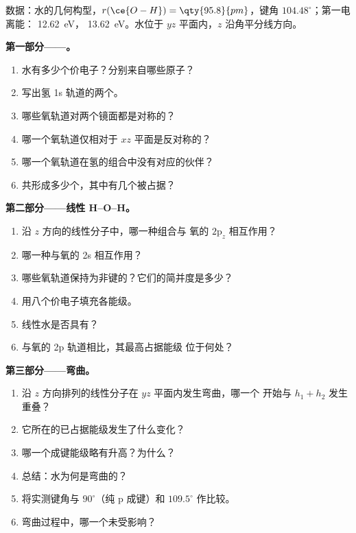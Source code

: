 \begin{problem}
\label{pb:b2:fragment-orbitals:1}
数据：水的几何构型，$r(\ce{O-H}) = \qty{95.8}{pm}$，键角
$104.48^\circ$；第一电离能： \qty{12.62}{eV}，
\qty{13.62}{eV}。水位于 $yz$ 平面内，$z$ 沿角平分线方向。

\medskip
\noindent\textbf{第一部分——。}
\begin{enumerate}
  \item 水有多少个价电子？分别来自哪些原子？
  \item 写出氢 1s 轨道的两个。
  \item 哪些氧轨道对两个镜面都是对称的？
  \item 哪一个氧轨道仅相对于 $xz$ 平面是反对称的？
  \item 哪一个氧轨道在氢的组合中没有对应的伙伴？
  \item 共形成多少个，其中有几个被占据？
\end{enumerate}

\medskip
\noindent\textbf{第二部分——线性 H--O--H。}
\begin{enumerate}[resume]
  \item 沿 $z$ 方向的线性分子中，哪一种组合与
        氧的 $2\mathrm p_z$ 相互作用？
  \item 哪一种与氧的 2s 相互作用？
  \item 哪些氧轨道保持为非键的？它们的简并度是多少？
  \item 用八个价电子填充各能级。
  \item 线性水是否具有？
  \item 与氧的 2p 轨道相比，其最高占据能级
        位于何处？
\end{enumerate}

\medskip
\noindent\textbf{第三部分——弯曲。}
\begin{enumerate}[resume]
  \item 沿 $z$ 方向排列的线性分子在 $yz$ 平面内发生弯曲，哪一个
        开始与 $h_1 + h_2$ 发生重叠？
  \item 它所在的已占据能级发生了什么变化？
  \item 哪一个成键能级略有升高？为什么？
  \item 总结：水为何是弯曲的？
  \item 将实测键角与 $90^\circ$（纯 p 成键）和 $109.5^\circ$ 作比较。
  \item 弯曲过程中，哪一个未受影响？
\end{enumerate}


\end{problem}
